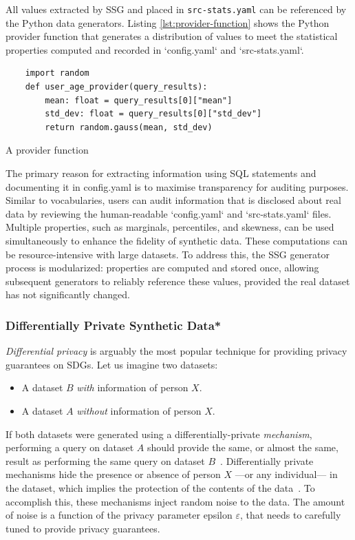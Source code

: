 \documentclass[11pt]{article}
\begin{document}
All values extracted by SSG and placed in \texttt{src-stats.yaml} can be referenced by the Python data generators. Listing \ref{lst:provider-function} shows the Python provider function that generates a distribution of values to meet the statistical properties computed and recorded in `config.yaml` and `src-stats.yaml`.

\begin{listing}[H]
\begin{verbatim}
    import random
    def user_age_provider(query_results):
        mean: float = query_results[0]["mean"]
        std_dev: float = query_results[0]["std_dev"]
        return random.gauss(mean, std_dev)
\end{verbatim} 
\caption{A provider function }
\label{lst:provider-function}
\end{listing}

The primary reason for extracting information using SQL statements and documenting it in config.yaml is to maximise transparency for auditing purposes. Similar to vocabularies, users can audit information that is disclosed about real data by reviewing the human-readable `config.yaml` and `src-stats.yaml` files. Multiple properties, such as marginals, percentiles, and skewness, can be used simultaneously to enhance the fidelity of synthetic data. These computations can be resource-intensive with large datasets. To address this, the SSG generator process is modularized: properties are computed and stored once, allowing subsequent generators to reliably reference these values, provided the real dataset has not significantly changed.

\subsubsection{Differentially Private Synthetic Data*}

\emph{Differential privacy} is arguably the most popular technique for providing privacy guarantees on SDGs.
Let us imagine two datasets:

\begin{itemize}
    \item A dataset $B$ \emph{with} information of person $X$.
    \item A dataset $A$ \emph{without} information of person $X$.
\end{itemize}

If both datasets were generated using a differentially-private \emph{mechanism}, performing a query on dataset $A$ should provide the same, or almost the same, result as performing the same query on dataset $B$~\cite{Kopp2021MicrosoftSD}.
Differentially private mechanisms hide the presence or absence of person $X$ ---or any individual--- in the dataset, which implies the protection of the contents of the data~\cite{near2021}.
To accomplish this, these mechanisms inject random noise to the data.
The amount of noise is a function of the privacy parameter epsilon $\varepsilon$, that needs to
carefully tuned to provide privacy guarantees.
\end{document}
